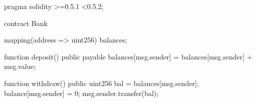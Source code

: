 \begin{soliditybox}
pragma solidity >=0.5.1 <0.5.2;

contract Bank {
    mapping(address => uint256) balances;

    function deposit() public payable {
        balances[msg.sender] = balances[msg.sender] + msg.value;
    }

    function withdraw() public {
        uint256 bal = balances[msg.sender];
        balance[msg.sender] = 0;
        msg.sender.transfer(bal);
    }
}
\end{soliditybox}
